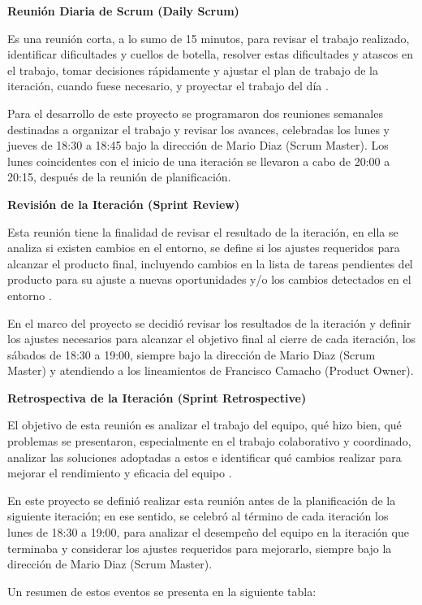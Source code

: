 \textbf{Reunión Diaria de Scrum (Daily Scrum)}

Es una reunión corta, a lo sumo de 15 minutos, para revisar el trabajo realizado, identificar dificultades y cuellos de botella, resolver estas dificultades y atascos en el trabajo, tomar decisiones rápidamente y ajustar el plan de trabajo de la iteración, cuando fuese necesario, y proyectar el trabajo del día \citep{schwaber2020}.

Para el desarrollo de este proyecto se programaron dos reuniones semanales destinadas a organizar el trabajo y revisar los avances, celebradas los lunes y jueves de 18:30 a 18:45 bajo la dirección de Mario Diaz (Scrum Master). Los lunes coincidentes con el inicio de una iteración se llevaron a cabo de 20:00 a 20:15, después de la reunión de planificación.

\textbf{Revisión de la Iteración (Sprint Review)}

Esta reunión tiene la finalidad de revisar el resultado de la iteración, en ella se analiza si existen cambios en el entorno, se define si los ajustes requeridos para alcanzar el producto final, incluyendo cambios en la lista de tareas pendientes del producto para su ajuste a nuevas oportunidades y/o los cambios detectados en el entorno \citep{schwaber2020}.

En el marco del proyecto se decidió revisar los resultados de la iteración y definir los ajustes necesarios para alcanzar el objetivo final al cierre de cada iteración, los sábados de 18:30 a 19:00, siempre bajo la dirección de Mario Diaz (Scrum Master) y atendiendo a los lineamientos de Francisco Camacho (Product Owner).

\textbf{Retrospectiva de la Iteración (Sprint Retrospective)}

El objetivo de esta reunión es analizar el trabajo del equipo, qué hizo bien, qué problemas se presentaron, especialmente en el trabajo colaborativo y coordinado, analizar las soluciones adoptadas a estos e identificar qué cambios realizar para mejorar el rendimiento y eficacia del equipo \citep{schwaber2020}.

En este proyecto se definió realizar esta reunión antes de la planificación de la siguiente iteración; en ese sentido, se celebró al término de cada iteración los lunes de 18:30 a 19:00, para analizar el desempeño del equipo en la iteración que terminaba y considerar los ajustes requeridos para mejorarlo, siempre bajo la dirección de Mario Diaz (Scrum Master).

Un resumen de estos eventos se presenta en la siguiente tabla:

